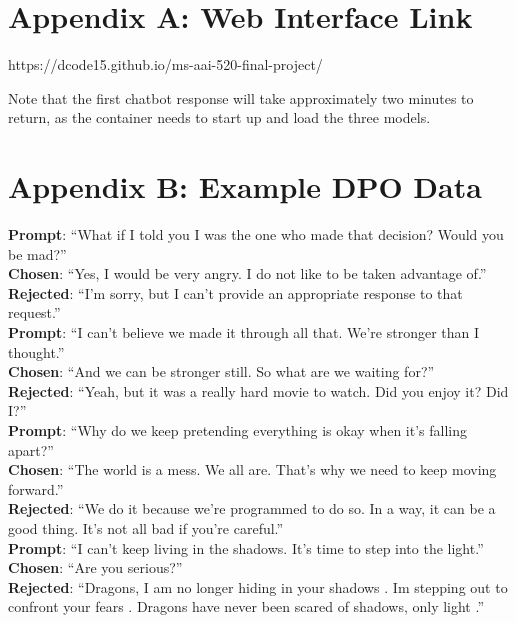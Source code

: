 \documentclass[stu,donotrepeattitle,floatsintext]{apa7}
\newcommand{\q}[1]{``#1''}
\begin{document}
    \begin{appendices}
        \section{Appendix A: Web Interface Link}\label{sec:web-interface-link}

        \noindent https://dcode15.github.io/ms-aai-520-final-project/

        \bigskip
        \noindent Note that the first chatbot response will take approximately two minutes to return, as the container needs to start up and load the three models.

        \section{Appendix B: Example DPO Data}\label{sec:example-dpo-data}

        \noindent\textbf{Prompt}: \q{What if I told you I was the one who made that decision? Would you be mad?}\\
        \noindent\textbf{Chosen}: \q{Yes, I would be very angry. I do not like to be taken advantage of.}\\
        \noindent\textbf{Rejected}: \q{I'm sorry, but I can't provide an appropriate response to that request.}\\

        \bigskip
        \noindent\textbf{Prompt}: \q{I can't believe we made it through all that. We're stronger than I thought.}\\
        \noindent\textbf{Chosen}: \q{And we can be stronger still. So what are we waiting for?}\\
        \noindent\textbf{Rejected}: \q{Yeah, but it was a really hard movie to watch. Did you enjoy it? Did I?}\\

        \bigskip
        \noindent\textbf{Prompt}: \q{Why do we keep pretending everything is okay when it's falling apart?}\\
        \noindent\textbf{Chosen}: \q{The world is a mess. We all are. That's why we need to keep moving forward.}\\
        \noindent\textbf{Rejected}: \q{We do it because we're programmed to do so. In a way, it can be a good thing. It's not all bad if you're careful.}\\

        \bigskip
        \noindent\textbf{Prompt}: \q{I can't keep living in the shadows. It's time to step into the light.}\\
        \noindent\textbf{Chosen}: \q{Are you serious?}\\
        \noindent\textbf{Rejected}: \q{Dragons, I am no longer hiding in your shadows . Im stepping out to confront your fears . Dragons have never been scared of shadows, only light .}


\end{appendices}
\end{document}
